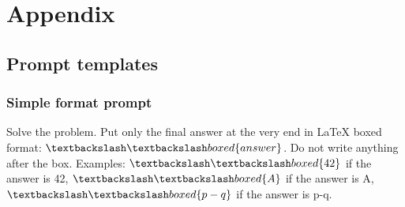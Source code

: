\documentclass[11pt]{article}
\begin{document}




\newpage
\appendix

\section{Appendix}
\label{sec:appendix}

\subsection{Prompt templates}

\subsubsection{Simple format prompt}\label{appendix:math_simple_prompt}
\begin{promptbox}
Solve the problem. Put only the final answer at the very end in LaTeX boxed format: $\textbackslash \textbackslash boxed\{answer\}$. Do not write anything after the box.
Examples: $\textbackslash \textbackslash boxed\{42\}$ if the answer is 42, $\textbackslash \textbackslash boxed\{A\}$ if the answer is A, $\textbackslash \textbackslash boxed\{p - q\}$ if the answer is p-q.
\end{promptbox}
\end{document}
